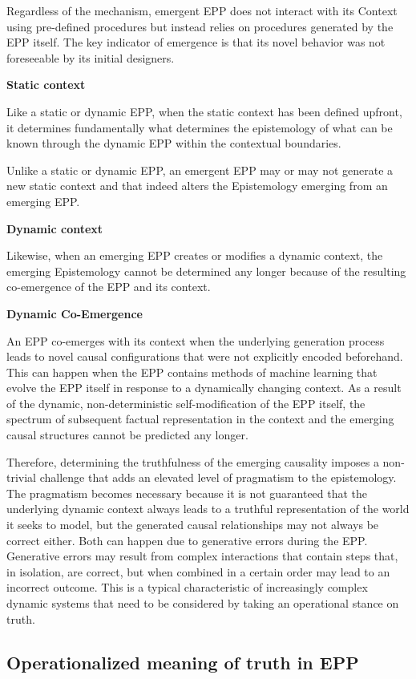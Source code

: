 Regardless of the mechanism, emergent EPP does not interact with its Context using pre-defined procedures but instead relies on procedures generated by the EPP itself. The key indicator of emergence is that its novel behavior was not foreseeable by its initial designers.

\textbf{Static context}

Like a static or dynamic EPP, when the static context has been defined upfront, it determines fundamentally what determines the epistemology of what can be known through the dynamic EPP within the contextual boundaries.

Unlike a static or dynamic EPP, an emergent EPP may or may not generate a new static context and that indeed alters the Epistemology emerging from an emerging EPP.

\textbf{Dynamic context}

Likewise, when an emerging EPP creates or modifies a dynamic context, the emerging Epistemology cannot be determined any longer because of the resulting co-emergence of the EPP and its context.

\textbf{Dynamic Co-Emergence}

An EPP co-emerges with its context when the underlying generation process leads to novel causal configurations that were not explicitly encoded beforehand. This can happen when the EPP contains methods of machine learning that evolve the EPP itself in response to a dynamically changing context. As a result of the dynamic, non-deterministic self-modification of the EPP itself, the spectrum of subsequent factual representation in the context and the emerging causal structures cannot be predicted any longer.

Therefore, determining the truthfulness of the emerging causality imposes a non-trivial challenge that adds an elevated level of pragmatism to the epistemology. The pragmatism becomes necessary because it is not guaranteed that the underlying dynamic context always leads to a truthful representation of the world it seeks to model, but the generated causal relationships may not always be correct either. Both can happen due to generative errors during the EPP. Generative errors may result from complex interactions that contain steps that, in isolation, are correct, but when combined in a certain order may lead to an incorrect outcome. This is a typical characteristic of increasingly complex dynamic systems that need to be considered by taking an operational stance on truth.

\subsection{Operationalized meaning of truth in EPP}

